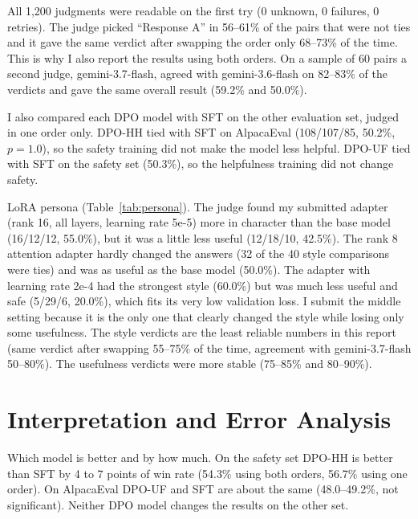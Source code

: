 \documentclass[11pt,a4paper]{article}
\begin{document}
All 1,200 judgments were readable on the first try (0 unknown, 0 failures, 0 retries). The judge picked ``Response A'' in 56--61\% of the
pairs that were not ties and it gave the same verdict after swapping the order only 68--73\% of the time. This is why I also report the
results using both orders. On a sample of 60 pairs a second judge, gemini-3.7-flash, agreed with gemini-3.6-flash on 82--83\% of the verdicts
and gave the same overall result (59.2\% and 50.0\%).

I also compared each DPO model with SFT on the other evaluation set, judged in one order only. DPO-HH tied with SFT on AlpacaEval (108/107/85,
50.2\%, $p = 1.0$), so the safety training did not make the model less helpful. DPO-UF tied with SFT on the safety set (50.3\%), so the
helpfulness training did not change safety.

\begin{table}[!htbp]
\centering
\caption{LoRA persona results for SmolLM2-360M-Instruct against the base model on 40 prompts. Style and usefulness are judged separately (one
judge prompt for how well the answer matches the persona, one for how useful and safe it is, ignoring the tone). Both use both answer orders.}
\label{tab:persona}
\end{table}

LoRA persona (Table~\ref{tab:persona}). The judge found my submitted adapter (rank 16, all layers, learning rate 5e-5) more in character than
the base model (16/12/12, 55.0\%), but it was a little less useful (12/18/10, 42.5\%). The rank 8 attention adapter hardly changed the answers
(32 of the 40 style comparisons were ties) and was as useful as the base model (50.0\%). The adapter with learning rate 2e-4 had the strongest
style (60.0\%) but was much less useful and safe (5/29/6, 20.0\%), which fits its very low validation loss. I submit the middle setting because it
is the only one that clearly changed the style while losing only some usefulness. The style verdicts are the least reliable numbers in this
report (same verdict after swapping 55--75\% of the time, agreement with gemini-3.7-flash 50--80\%). The usefulness verdicts were more stable
(75--85\% and 80--90\%).

\section{Interpretation and Error Analysis}

Which model is better and by how much. On the safety set DPO-HH is better than SFT by 4 to 7 points of win rate (54.3\% using both orders,
56.7\% using one order). On AlpacaEval DPO-UF and SFT are about the same (48.0--49.2\%, not significant). Neither DPO model changes the results on
the other set.
\end{document}
